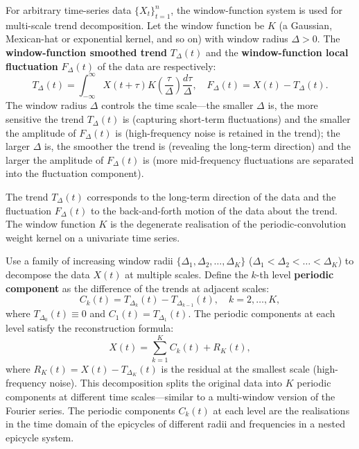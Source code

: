 \begin{definition}\label{def:data_window_decomposition}
For arbitrary time-series data $\{X_t\}_{t=1}^{n}$, the window-function system is used for multi-scale trend decomposition. Let the window function be $K$ (a Gaussian, Mexican-hat or exponential kernel, and so on) with window radius $\Delta > 0$. The \textbf{window-function smoothed trend} $T_\Delta(t)$ and the \textbf{window-function local fluctuation} $F_\Delta(t)$ of the data are respectively:
\[
T_\Delta(t) = \int_{-\infty}^{\infty} X(t+\tau) K\left(\frac{\tau}{\Delta}\right) \frac{d\tau}{\Delta}, \quad F_\Delta(t) = X(t) - T_\Delta(t).
\]
The window radius $\Delta$ controls the time scale---the smaller $\Delta$ is, the more sensitive the trend $T_\Delta(t)$ is (capturing short-term fluctuations) and the smaller the amplitude of $F_\Delta(t)$ is (high-frequency noise is retained in the trend); the larger $\Delta$ is, the smoother the trend is (revealing the long-term direction) and the larger the amplitude of $F_\Delta(t)$ is (more mid-frequency fluctuations are separated into the fluctuation component).

The trend $T_\Delta(t)$ corresponds to the long-term direction of the data and the fluctuation $F_\Delta(t)$ to the back-and-forth motion of the data about the trend. The window function $K$ is the degenerate realisation of the periodic-convolution weight kernel on a univariate time series.
\end{definition}

\begin{definition}\label{def:multi_window_decomposition}
Use a family of increasing window radii $\{\Delta_1, \Delta_2, \dots, \Delta_K\}$ ($\Delta_1 < \Delta_2 < \dots < \Delta_K$) to decompose the data $X(t)$ at multiple scales. Define the $k$-th level \textbf{periodic component} as the difference of the trends at adjacent scales:
\[
C_k(t) = T_{\Delta_k}(t) - T_{\Delta_{k-1}}(t), \quad k = 2, \dots, K,
\]
where $T_{\Delta_0}(t) \equiv 0$ and $C_1(t) = T_{\Delta_1}(t)$. The periodic components at each level satisfy the reconstruction formula:
\[
X(t) = \sum_{k=1}^{K} C_k(t) + R_K(t),
\]
where $R_K(t) = X(t) - T_{\Delta_K}(t)$ is the residual at the smallest scale (high-frequency noise). This decomposition splits the original data into $K$ periodic components at different time scales---similar to a multi-window version of the Fourier series. The periodic components $C_k(t)$ at each level are the realisations in the time domain of the epicycles of different radii and frequencies in a nested epicycle system.
\end{definition}

